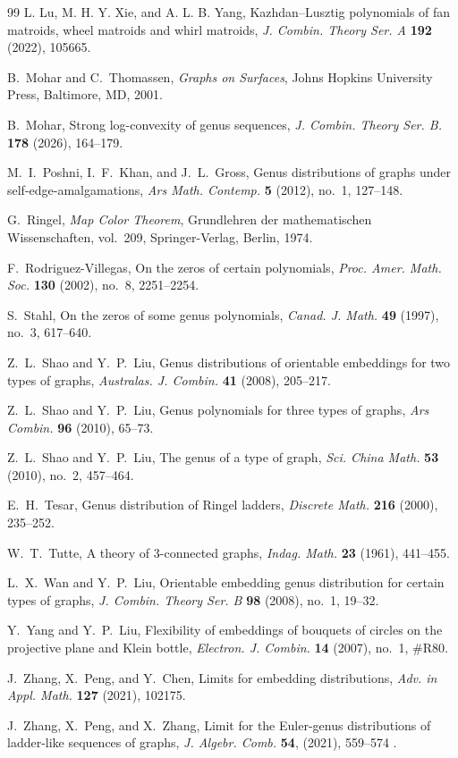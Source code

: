 \documentclass[12pt]{article}
\theoremstyle{definition}
\begin{document}
\begin{thebibliography}{99}
L. Lu, M. H. Y. Xie, and A. L. B. Yang,
Kazhdan--Lusztig polynomials of fan matroids, wheel matroids and whirl matroids,
\emph{J. Combin. Theory Ser. A} \textbf{192} (2022), 105665.

B.~Mohar and C.~Thomassen,
\emph{Graphs on Surfaces},
Johns Hopkins University Press, Baltimore, MD, 2001.

B.~Mohar,
Strong log-convexity of genus sequences,
\emph{J. Combin. Theory Ser. B.} \textbf{178} (2026), 164--179.

M.~I.~Poshni, I.~F.~Khan, and J.~L.~Gross,
Genus distributions of graphs under self-edge-amalgamations,
\emph{Ars Math. Contemp.} \textbf{5} (2012), no.~1, 127--148.


G.~Ringel,
\emph{Map Color Theorem},
Grundlehren der mathematischen Wissenschaften, vol.~209,
Springer-Verlag, Berlin, 1974.

F.~Rodriguez-Villegas,
On the zeros of certain polynomials,
\emph{Proc. Amer. Math. Soc.} \textbf{130} (2002), no.~8, 2251--2254.

S.~Stahl,
On the zeros of some genus polynomials,
\emph{Canad. J. Math.} \textbf{49} (1997), no.~3, 617--640.


Z.~L.~Shao and Y.~P.~Liu, Genus distributions of orientable embeddings for two types of graphs, \emph{Australas. J. Combin.} \textbf{ 41} (2008),
205--217.

Z.~L.~Shao and Y.~P.~Liu, Genus polynomials for three types of graphs, \emph{Ars Combin.} \textbf{96} (2010), 65--73.


Z.~L.~Shao and Y.~P.~Liu,
The genus of a type of graph,
\emph{Sci. China Math.} \textbf{53} (2010), no.~2, 457--464.



E.~H.~Tesar,
Genus distribution of Ringel ladders,
\emph{Discrete Math.} \textbf{216} (2000), 235--252.

W.~T.~Tutte,
A theory of 3-connected graphs,
\emph{Indag. Math.}
\textbf{23} (1961), 441--455.

L.~X.~Wan and Y.~P.~Liu,
Orientable embedding genus distribution for certain types of graphs,
\emph{J. Combin. Theory Ser. B} \textbf{98} (2008), no.~1, 19--32.

Y.~Yang and Y.~P.~Liu,
Flexibility of embeddings of bouquets of circles on the projective plane and Klein bottle,
\emph{Electron. J. Combin.} \textbf{14} (2007), no.~1, \#R80.

J.~Zhang, X.~Peng, and Y.~Chen,
Limits for embedding distributions,
\emph{Adv. in Appl. Math.} \textbf{127} (2021), 102175.

J.~Zhang, X.~Peng, and X.~Zhang,
Limit for the Euler-genus distributions of ladder-like sequences of graphs,
\emph{J. Algebr. Comb.}  \textbf{54}, (2021), 559--574 .
\end{thebibliography}
\end{document}
